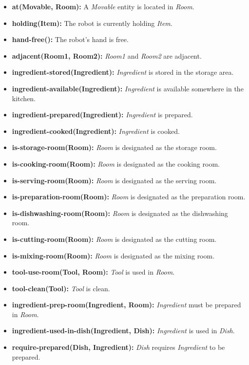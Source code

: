 \documentclass{article}
\begin{document}
\begin{itemize}[label=--, itemsep=0.05em]
    \item \textbf{at(Movable, Room):} A \textit{Movable} entity is located in \textit{Room}.
    \item \textbf{holding(Item):} The robot is currently holding \textit{Item}.
    \item \textbf{hand-free():} The robot's hand is free.
    \item \textbf{adjacent(Room1, Room2):} \textit{Room1} and \textit{Room2} are adjacent.
    \item \textbf{ingredient-stored(Ingredient):} \textit{Ingredient} is stored in the storage area.
    \item \textbf{ingredient-available(Ingredient):} \textit{Ingredient} is available somewhere in the kitchen.
    \item \textbf{ingredient-prepared(Ingredient):} \textit{Ingredient} is prepared.
    \item \textbf{ingredient-cooked(Ingredient):} \textit{Ingredient} is cooked.
    \item \textbf{is-storage-room(Room):} \textit{Room} is designated as the storage room.
    \item \textbf{is-cooking-room(Room):} \textit{Room} is designated as the cooking room.
    \item \textbf{is-serving-room(Room):} \textit{Room} is designated as the serving room.
    \item \textbf{is-preparation-room(Room):} \textit{Room} is designated as the preparation room.
    \item \textbf{is-dishwashing-room(Room):} \textit{Room} is designated as the dishwashing room.
    \item \textbf{is-cutting-room(Room):} \textit{Room} is designated as the cutting room.
    \item \textbf{is-mixing-room(Room):} \textit{Room} is designated as the mixing room.
    \item \textbf{tool-use-room(Tool, Room):} \textit{Tool} is used in \textit{Room}.
    \item \textbf{tool-clean(Tool):} \textit{Tool} is clean.
    \item \textbf{ingredient-prep-room(Ingredient, Room):} \textit{Ingredient} must be prepared in \textit{Room}.
    \item \textbf{ingredient-used-in-dish(Ingredient, Dish):} \textit{Ingredient} is used in \textit{Dish}.
    \item \textbf{require-prepared(Dish, Ingredient):} \textit{Dish} requires \textit{Ingredient} to be prepared.

\end{itemize}
\end{document}
